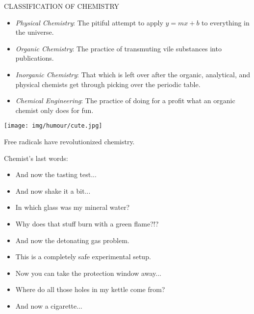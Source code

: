 CLASSIFICATION OF CHEMISTRY 

\begin{itemize}
	\item \textit{Physical Chemistry}: The pitiful attempt to apply $y = mx+b$ to everything in the universe.

	\item \textit{Organic Chemistry}: The practice of transmuting vile substances into publications.

	\item \textit{Inorganic Chemistry}: That which is left over after the organic, analytical, and physical chemists get through picking over the periodic table.

	\item \textit{Chemical Engineering}: The practice of doing for a profit what an organic chemist only does for fun.
\end{itemize}
\begin{center}\underline{\hspace{5 cm}}\end{center}

\begin{center}
\texttt{[image: img/humour/cute.jpg]}
\end{center}

\begin{center}\underline{\hspace{5 cm}}\end{center}

Free radicals have revolutionized chemistry.
\begin{center}\underline{\hspace{5 cm}}\end{center}

Chemist's last words: 

\begin{itemize}
	\item And now the tasting test... 

	\item And now shake it a bit... 

	\item In which glass was my mineral water? 

	\item Why does that stuff burn with a green flame?!? 

	\item And now the detonating gas problem. 

	\item This is a completely safe experimental setup. 

	\item Now you can take the protection window away... 

	\item Where do all those holes in my kettle come from? 

	\item And now a cigarette... 
\end{itemize}

